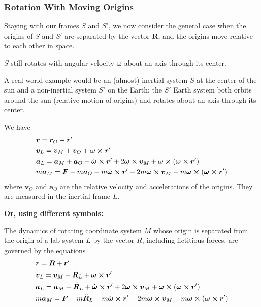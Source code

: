 \documentclass[11pt, a4paper]{article}
\begin{document}
\subsubsection{Rotation With Moving Origins}
Staying with our frames $ S $ and $ S' $, we now consider the general case when the origins of $ S $ and $ S' $ are separated by the vector $ \bm{R} $, and the origins move relative to each other in space. 

$ S $ still rotates with angular velocity $ \bm{\omega} $ about an axis through its center.

A real-world example would be an (almost) inertial system $ S $ at the center of the sun and a non-inertial system $ S' $ on the Earth; the $ S' $ Earth system both orbits around the sun (relative motion of origins) and rotates about an axis through its center. 

We have
\begin{align*}
	&\bm{r} = \bm{r}_{O} + \bm{r}'\\
	&\bm{v}_{L} = \bm{v}_{M} + \bm{v}_{O} + \bm{\omega} \cross \bm{r}'\\
	&\bm{a}_{L} = \bm{a}_{M} + \bm{a}_{O} + \dot{\bm{\omega}}\cross \bm{r}' +  2 \bm{\omega} \cross \bm{v}_{M} + \bm{\omega} \cross (\bm{\omega} \cross \bm{r}')\\
	&m\bm{a}_{M} = \bm{F} - m \bm{a}_{O} - m\dot{\bm{\omega}}\cross \bm{r}' -  2m \bm{\omega} \cross \bm{v}_{M} - m\bm{\omega} \cross (\bm{\omega} \cross \bm{r}')
\end{align*}
where $ \bm{v}_{O} $ and $ \bm{a}_{O} $ are the relative velocity and accelerations of the origins. They are measured in the inertial frame $ L $.

\textbf{Or, using different symbols:}

The dynamics of rotating coordinate system $ M $ whose origin is separated from the origin of a lab system $ L $ by the vector $ R $, including fictitious forces, are governed by the equations
\begin{align*}
	&\bm{r} = \bm{R} + \bm{r}'\\
	&\bm{v}_{L} = \bm{v}_{M} + \dot{\bm{R}}_{L} + \bm{\omega} \cross \bm{r}'\\
	&\bm{a}_{L} = \bm{a}_{M} + \ddot{\bm{R}}_{L} + \dot{\bm{\omega}}\cross \bm{r}' +  2 \bm{\omega} \cross \bm{v}_{M} + \bm{\omega} \cross (\bm{\omega} \cross \bm{r}')\\
	&m\bm{a}_{M} = \bm{F} - m \ddot{\bm{R}}_{L} - m\dot{\bm{\omega}}\cross \bm{r}' -  2m \bm{\omega} \cross \bm{v}_{M} - m\bm{\omega} \cross (\bm{\omega} \cross \bm{r}')
\end{align*}
\end{document}
